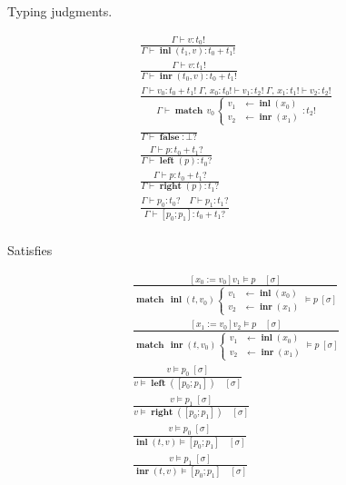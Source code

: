 \documentclass[twocolumn, fleqn]{scrartcl}
\DeclareMathOperator{\inl}{\textbf{inl}}
\DeclareMathOperator{\inr}{\textbf{inr}}
\DeclareMathOperator{\false}{\textbf{false}}
\DeclareMathOperator{\lft}{\textbf{left}}
\DeclareMathOperator{\rgt}{\textbf{right}}
\DeclareMathOperator{\update}{:=}
\DeclareMathOperator{\case}{\textbf{match}}
\begin{document}
Typing judgments.

\begin{multline*}
\frac{
  \Gamma \vdash v \colon t_0 !
}{
  \Gamma \vdash \inl(t_1, v) \colon t_0 + t_1 !
}\\
\frac{
  \Gamma \vdash v \colon t_1 !
}{
  \Gamma \vdash \inr(t_0, v) \colon t_0 + t_1 !
}\\
\frac{
  \Gamma \vdash v_0 \colon t_0 + t_1 ! \;
  \Gamma , \, x_0 \colon t_0 ! \vdash v_1 \colon t_2 ! \;
  \Gamma , \, x_1 \colon t_1 ! \vdash v_2 \colon t_2 !
}{
  \Gamma \vdash
  \case \, v_0 \,
  \begin{cases}
   v_1 & \leftarrow \inl(x_0) \\
   v_2 & \leftarrow \inr(x_1)
  \end{cases}
  \colon t_2 !
}\\
\frac{
}{
  \Gamma \vdash \false \colon \bot ?
}\\
\frac{
  \Gamma \vdash p \colon t_0 + t_1 ?
}{
  \Gamma \vdash \lft(p) \colon t_0 ?
}\\
\frac{
  \Gamma \vdash p \colon t_0 + t_1 ?
}{
  \Gamma \vdash \rgt(p) \colon t_1 ?
}\\
\frac{
  \Gamma \vdash p_0 \colon t_0 ? \quad
  \Gamma \vdash p_1 \colon t_1 ?
}{
  \Gamma \vdash [ p_0 ; p_1 ] \colon t_0 + t_1 ?
}\\
\end{multline*}

Satisfies

\begin{multline*}
\frac{
  [x_0 \update v_0] v_1 \models p \quad [\sigma]
}{
  \case \, \inl(t, v_0) \,
  \begin{cases}
    v_1 & \leftarrow \inl(x_0) \\
    v_2 & \leftarrow \inr(x_1)
  \end{cases}
 \models p \; [\sigma]
}\\
\frac{
  [x_1 \update v_0] v_2 \models p \quad [\sigma]
}{
  \case \, \inr(t, v_0) \,
  \begin{cases}
    v_1 & \leftarrow \inl(x_0) \\
    v_2 & \leftarrow \inr(x_1)
  \end{cases}
  \models p \; [\sigma]
}\\
\frac{
  v \models p_0 \; [\sigma]
}{
  v \models \lft([ p_0 ; p_1 ]) \quad [\sigma]
}\\
\frac{
  v \models p_1 \; [\sigma]
}{
  v \models \rgt([ p_0 ; p_1 ]) \quad [\sigma]
}\\
\frac{
  v \models p_0 \; [\sigma]
}{
  \inl(t, v) \models [ p_0 ; p_1 ] \quad [\sigma]
}\\
\frac{
  v \models p_1 \; [\sigma]
}{
  \inr(t, v) \models [ p_0 ; p_1 ] \quad [\sigma]
}\\
\end{multline*}
\end{document}
